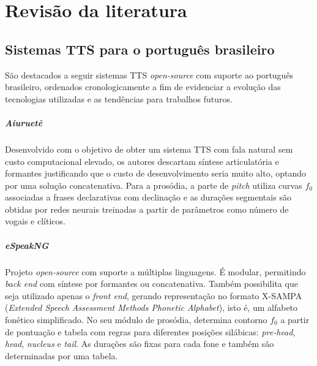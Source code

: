 

\chapter{Revisão da literatura}

\section{Sistemas TTS para o português brasileiro}
\label{sistemas}

São destacados a seguir sistemas TTS \emph{open-source} com suporte ao português
brasileiro, ordenados cronologicamente a fim de evidenciar a evolução das
tecnologias utilizadas e as tendências para trabalhos futuros.

\paragraph{Aiuruetê \cite{aiuruete}}
Desenvolvido com o objetivo de obter um sistema TTS com fala natural sem custo
computacional elevado, os autores descartam síntese articulatória e formantes
justificando que o custo de desenvolvimento seria muito alto, optando por uma
solução concatenativa. Para a prosódia, a parte de \emph{pitch} utiliza curvas
$ f_0 $ associadas a frases declarativas com declinação e as durações segmentais são
obtidas por redes neurais treinadas a partir de parâmetros como número de vogais
e clíticos.

\paragraph{eSpeakNG \cite{espeakng}}
Projeto \emph{open-source} com suporte a múltiplas linguagens. É modular,
permitindo \emph{back end} com síntese por formantes ou concatenativa. Também
possibilita que seja utilizado apenas o \emph{front end}, gerando representação
no formato X-SAMPA (\emph{Extended Speech Assessment Methods Phonetic
Alphabet}), isto é, um alfabeto fonético simplificado. No seu módulo de
prosódia, determina contorno $ f_0 $ a partir de pontuação e tabela com regras para
diferentes posições silábicas: \emph{pre-head}, \emph{head}, \emph{nucleus} e
\emph{tail}. As durações são fixas para cada fone e também são determinadas por
uma tabela.

